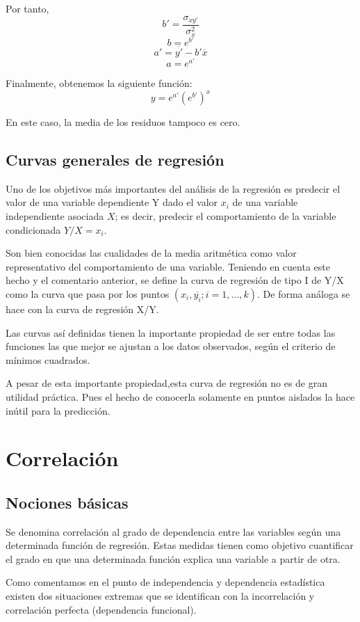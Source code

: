\documentclass{article}
\theoremstyle{definition}
\begin{document}
	Por tanto,
	$$ b' = \frac{\sigma_{xy'} }{\sigma_{x}^2} $$
	$$ b = e^{b'} $$
	$$ a' = \overline{y'} - b'\overline{x} $$
	$$ a = e^{a'} $$

	Finalmente, obtenemos la siguiente función:
	$$ y = e^{a'}(e^{b'})^{x} $$

	En este caso, la media de los residuos tampoco es cero.


\subsection{Curvas generales de regresión}

Uno de los objetivos más importantes del análisis de la regresión es predecir el
valor de una variable dependiente Y dado el valor $x_i$ de una variable
independiente asociada $X$; es decir, predecir el comportamiento de la variable
condicionada $Y/X = x_i$.

Son bien conocidas las cualidades de la media aritmética como valor
representativo del comportamiento de una variable. Teniendo en cuenta este hecho
y el comentario anterior, se define la curva de regresión de tipo I de Y/X como
la curva que pasa por los puntos $(x_i,\overline{y_i}; i = 1,\ldots,k)$.
De forma análoga se hace con la curva de regresión X/Y.

Las curvas así definidas tienen la importante propiedad de ser entre todas las
funciones las que mejor se ajustan a los datos observados, según el criterio de
mínimos cuadrados.

A pesar de esta importante propiedad,esta curva de regresión no es de gran
utilidad práctica. Pues el hecho de conocerla solamente en puntos aislados la
hace inútil para la predicción.

\section{Correlación}

\subsection{Nociones básicas}

Se denomina correlación al grado de dependencia entre las variables según una
determinada función de regresión. Estas medidas tienen como objetivo cuantificar
el grado en que una determinada función explica una variable a partir de otra.

Como comentamos en el punto de independencia y dependencia estadística existen
dos situaciones extremas que se identifican con la incorrelación y correlación
perfecta (dependencia funcional).
\end{document}

